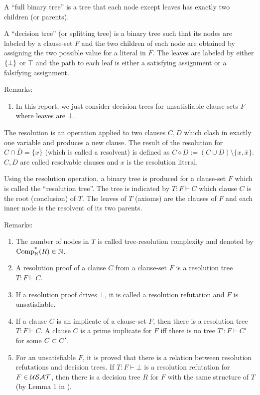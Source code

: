 \documentclass{report}
\begin{document}
A ``full binary tree'' is a tree that each node except leaves has exactly two children (or parents). 
\begin{defi}\label{def:decs-tree}
A ``decision tree'' (or splitting tree) is a binary tree such that its nodes are labeled by a clause-set $F$ and the two children of each node are obtained by assigning the two possible value for a literal in $F$. The leaves are labeled by either $\{ \bot \}$ or $\top$ and the path to each leaf is either a satisfying assignment or a falsifying assignment.
\end{defi}
Remarks:
  \begin{enumerate}
  \item  In this report, we just consider decision trees for unsatisfiable clause-sets $F$ where leaves are $\bot$.
  \end{enumerate}

\begin{defi}\label{def:resolution}
The resolution is an operation applied to two clauses $C,D$ which clash in exactly one variable and produces a new clause. The result of the resolution for $C \cap \overline D = \{ x \}$ (which is called a resolvent) is defined as $C \diamond D := (C \cup D) \setminus \{x, \overline x\} $. $C,D$ are called resolvable clauses and $x$ is the resolution literal. 
\end{defi}
\begin{defi}\label{def:resolution-tree}
Using the resolution operation, a binary tree is produced for a clause-set $F$ which is called the ``resolution tree''. The tree is indicated by $T : F \vdash C$ which clause $C$ is the root (conclusion) of $T$. The leaves of $T$ (axioms) are the clauses of $F$ and each inner node is the resolvent of its two parents. 
\end{defi}
Remarks:
  \begin{enumerate}
  \item  The number of nodes in $T$ is called tree-resolution complexity and denoted by $\operatorname{\operatorname{Comp}_{R}^*}(R) \in \mathbb{N}$.
  \item  A resolution proof of a clause $C$ from a clause-set $F$ is a resolution tree $T : F \vdash C$.
  \item  If a resolution proof drives $\bot$, it is called a resolution refutation and $F$ is unsatisfiable.
  \item If a clause $C$ is an implicate of a clause-set $F$, then there is a resolution tree $T : F \vdash C$. A clause $C$ is a prime implicate for $F$ iff there is no tree $T': F \vdash C'$ for some $C \subset C'$.
  \item For an unsatisfiable $F$, it is proved that there is a relation between resolution refutations and decision trees. If $T : F \vdash \bot$ is a resolution refutation for $F \in \mathcal{USAT}$, then there is a decision tree $R$ for $F$ with the same structure of $T$ (by Lemma 1 in \cite{h30}).
  \end{enumerate}
\end{document}
